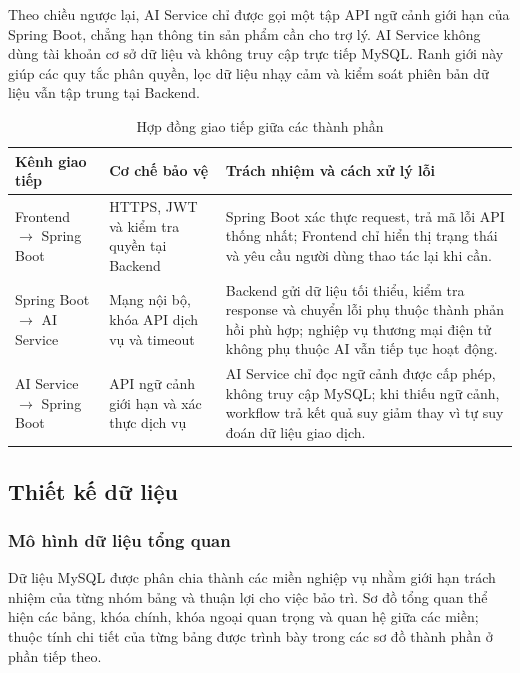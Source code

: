 Theo chiều ngược lại, AI Service chỉ được gọi một tập API ngữ cảnh giới hạn của Spring Boot, chẳng hạn thông tin sản phẩm cần cho trợ lý. AI Service không dùng tài khoản cơ sở dữ liệu và không truy cập trực tiếp MySQL. Ranh giới này giúp các quy tắc phân quyền, lọc dữ liệu nhạy cảm và kiểm soát phiên bản dữ liệu vẫn tập trung tại Backend.

\begin{table}[H]
    \centering
    \caption{Hợp đồng giao tiếp giữa các thành phần}
    \label{tab:service-communication-contracts}
    \begin{tabularx}{\textwidth}{|p{}|p{}|X|}
        \hline
        \textbf{Kênh giao tiếp} & \textbf{Cơ chế bảo vệ} & \textbf{Trách nhiệm và cách xử lý lỗi} \\
        \hline
        Frontend $\rightarrow$ Spring Boot & HTTPS, JWT và kiểm tra quyền tại Backend & Spring Boot xác thực request, trả mã lỗi API thống nhất; Frontend chỉ hiển thị trạng thái và yêu cầu người dùng thao tác lại khi cần. \\
        \hline
        Spring Boot $\rightarrow$ AI Service & Mạng nội bộ, khóa API dịch vụ và timeout & Backend gửi dữ liệu tối thiểu, kiểm tra response và chuyển lỗi phụ thuộc thành phản hồi phù hợp; nghiệp vụ thương mại điện tử không phụ thuộc AI vẫn tiếp tục hoạt động. \\
        \hline
        AI Service $\rightarrow$ Spring Boot & API ngữ cảnh giới hạn và xác thực dịch vụ & AI Service chỉ đọc ngữ cảnh được cấp phép, không truy cập MySQL; khi thiếu ngữ cảnh, workflow trả kết quả suy giảm thay vì tự suy đoán dữ liệu giao dịch. \\
        \hline
    \end{tabularx}
\end{table}

\subsection{Thiết kế dữ liệu}

\subsubsection{Mô hình dữ liệu tổng quan}

Dữ liệu MySQL được phân chia thành các miền nghiệp vụ nhằm giới hạn trách nhiệm
của từng nhóm bảng và thuận lợi cho việc bảo trì. Sơ đồ tổng quan thể hiện các
bảng, khóa chính, khóa ngoại quan trọng và quan hệ giữa các miền; thuộc tính chi
tiết của từng bảng được trình bày trong các sơ đồ thành phần ở phần tiếp theo.

